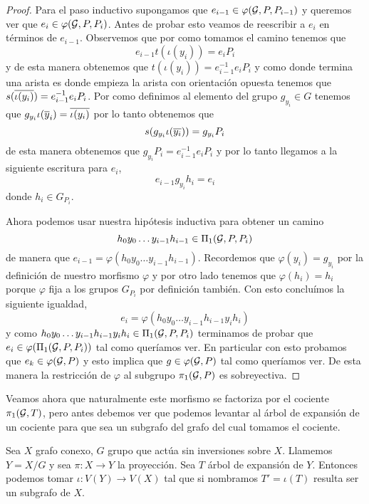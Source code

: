 \documentclass[tesis.tex]{subfiles}
\begin{document}
\begin{proof}
	Para el paso inductivo supongamos que $e_{i-1} \in \varphi({\cal G}, P, P_{i-1})$ y queremos ver que $e_i \in \varphi({\cal G}, P, P_{i})$.
	Antes de probar esto veamos de reescribir a $e_i$ en términos de $e_{i-1}$.
	Observemos que por como tomamos el camino tenemos que
	\[
		e_{i-1} t(\iota (y_i)) = e_i P_i 
	\]
	y de esta manera obtenemos que $t(\iota (y_i)) = e_{i-1}^{-1} e_i P_i$ y como donde termina una arista es donde empieza la arista con orientación opuesta tenemos que $s(\overline{\iota(y_i)}) = e_{i-1}^{-1} e_i P_i$. 
	Por como definimos al elemento del grupo $g_{y_i} \in G$ tenemos que $g_{y_i} \iota (\overline y_i) = \overline{\iota (y_i)}$ por lo tanto obtenemos que 
	\[
		s(g_{y_i} \iota (\overline{y_i})) = g_{y_i} P_i
	\]
	de esta manera obtenemos que $g_{y_i} P_i = e_{i-1}^{-1} e_i P_i$ y por lo tanto llegamos a la siguiente escritura para $e_i$,
	\begin{equation*}
		e_{i-1}g_{y_i} h_i  = e_i 
	\end{equation*}
	donde $h_i \in G_{P_i}$. 
	
	Ahora podemos usar nuestra hipótesis inductiva para obtener un camino 
	\[
		h_0y_0 \dots y_{i-1}h_{i-1} \in \Pi_1({\cal G}, P, P_i)
	\]
	de manera que $e_{i-1} =  \varphi(h_0y_0 \dots y_{i-1}h_{i-1})$. 
	Recordemos que $\varphi(y_i) = g_{y_i}$ por la definición de nuestro morfismo $\varphi$ y por otro lado tenemos que $\varphi(h_i) = h_i$ porque $\varphi$ fija a los grupos $G_{P_i}$ por definición también.
	Con esto concluímos la siguiente igualdad,
	\[
		e_i = \varphi(h_0y_0 \dots y_{i-1}h_{i-1} y_i h_i)
	\]
	y como $h_0y_0 \dots y_{i-1}h_{i-1} y_i h_i \in \Pi_1({\cal G}, P, P_i)$ terminamos de probar que $e_{i} \in \varphi(\Pi_1({\cal G}, P, P_i))$ tal como queríamos ver. 
	En particular con esto probamos que $e_k \in \varphi({\cal G}, P)$ y esto implica que $g \in \varphi({\cal G}, P)$ tal como queríamos ver.
	De esta manera la restricción de $\varphi$ al subgrupo $\pi_1({\cal G}, P)$ es sobreyectiva.
\end{proof}

Veamos ahora que naturalmente este morfismo se factoriza por el cociente $\pi_1({\cal G}, T)$, pero antes debemos ver que podemos levantar al árbol de expansión de un cociente para que sea un subgrafo del grafo del cual tomamos el cociente.

\begin{prop}
	Sea $X$ grafo conexo, $G$ grupo que actúa sin inversiones sobre $X$.
	Llamemos $Y= X / G$ y sea $\pi:X \to Y$ la proyección. 
	Sea $T$ árbol de expansión de $Y$.
	Entonces podemos tomar $\iota:V(Y) \to V(X)$ tal que si nombramos $T' = \iota(T)$ resulta ser un subgrafo de $X$.
\end{prop}
\end{document}
